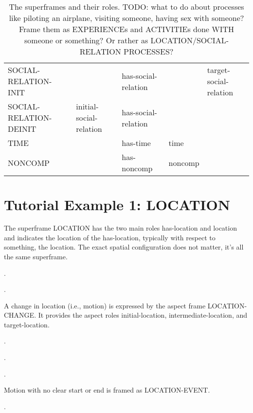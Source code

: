 \documentclass[a4paper]{article}
\newcommand{\fr}[1]{\textsf{#1}}
\newcommand{\rl}[1]{\textsf{#1}}
\begin{document}
\begin{table}
{\begin{tabular}{lllll}
            \fr{SOCIAL-RELATION-INIT} & & \rl{has-social-relation} & & \rl{target-social-relation} \\
            \fr{SOCIAL-RELATION-DEINIT} & \rl{initial-social-relation} & \rl{has-social-relation} & & \\
            \fr{TIME} & & \rl{has-time} & \rl{time} & \\
            \midrule
            \fr{NONCOMP} & & \rl{has-noncomp} & \rl{noncomp} \\
            \bottomrule
        \end{tabular}
    }
    \caption{The superframes and their roles. TODO: what to do about processes like piloting an airplane, visiting someone, having sex with someone? Frame them as EXPERIENCEs and ACTIVITIEs done WITH someone or something? Or rather as LOCATION/SOCIAL-RELATION PROCESSES?}
    \label{tab:superframes}
\end{table}

\section{Tutorial Example 1: \fr{LOCATION}}

The superframe \fr{LOCATION} has the two main roles \rl{has-location} and
\rl{location} and indicates the location of the \rl{has-location}, typically with
respect to something, the \rl{location}. The exact spatial configuration does
not matter, it's all the same superframe.

\ex.

\ex.

A change in location (i.e., motion) is expressed by the aspect frame
\fr{LOCATION-CHANGE}. It provides the aspect roles \rl{initial-location},
\rl{intermediate-location}, and \rl{target-location}.

\ex.

\ex.

\ex.

Motion with no clear start or end is framed as \fr{LOCATION-EVENT}.

\ex.
\end{document}
